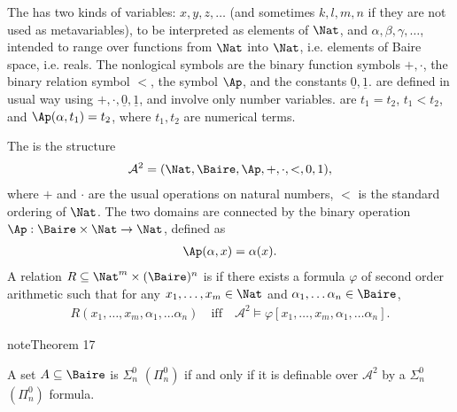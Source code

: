 \documentclass[letterpaper,10pt,english]{jupyterBook}
\begin{document}
\sphinxAtStartPar
The
 has two kinds of variables:  \(x,y,z, \dots\) (and sometimes \(k,l,m,n\) if they are not used as metavariables), to be interpreted as elements of \(\Nat\), and  \(\alpha,\beta,\gamma,\dots\), intended to range over functions from \(\Nat\) into \(\Nat\), i.e. elements of Baire space, i.e. reals. The non\sphinxhyphen{}logical symbols are the binary function symbols \(+,\cdot\), the binary relation symbol \(<\), the  symbol \(\Ap\), and the constants \(\underline{0}, \underline{1}\).   are defined in usual way using \(+,\cdot,\underline{0},\underline{1}\), and involve only number variables.  are \(t_1 = t_2\), \(t_1 < t_2\), and \(\Ap(\alpha,t_1) = t_2\), where \(t_1, t_2\) are numerical terms.

\sphinxAtStartPar
The
 is the structure
\begin{equation*}
\begin{split}
\mathcal{A}^2 = (\Nat, \Baire, \Ap, +, \cdot, <, 0, 1),
\end{split}
\end{equation*}
\sphinxAtStartPar
where \(+\) and \(\cdot\) are the usual operations on natural numbers, \(<\) is the standard ordering of \(\Nat\). The two domains are connected by the binary operation \(\Ap: \Baire \times \Nat \to \Nat\), defined as
\begin{equation*}
\begin{split}
\Ap(\alpha,x) = \alpha(x).
\end{split}
\end{equation*}
\sphinxAtStartPar
A relation \(R \subseteq \Nat^m \times (\Baire)^n\) is  if there exists a formula \(\varphi\) of second order arithmetic such that for any \(x_1, \dots, x_m \in \Nat\) and \(\alpha_1, \dots \alpha_n \in \Baire\),
\begin{equation*}
\begin{split}
R(x_1, \dots, x_m, \alpha_1, \dots \alpha_n) \quad \text{iff} \quad \mathcal{A}^2 \models \varphi[x_1, \dots, x_m, \alpha_1, \dots \alpha_n].
\end{split}
\end{equation*}\label{codingBorel:lightface-definability}
\begin{sphinxadmonition}{note}{Theorem 17}



\sphinxAtStartPar
A set \(A \subseteq \Baire\) is \(\Sigma^0_n\) \((\Pi^0_n)\) if and only if it is definable over \(\mathcal{A}^2\) by a \(\Sigma^0_n\) \((\Pi^0_n)\) formula.
\end{sphinxadmonition}
\end{document}
